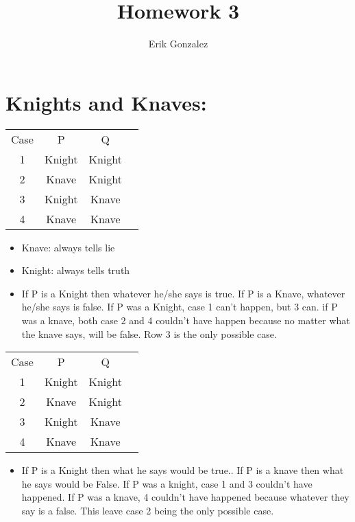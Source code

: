 \documentclass[11pt]{article}
\title{Homework 3}
\author{Erik Gonzalez}
\begin{document}
\maketitle



\section*{Knights and Knaves:}



\begin{center}
\begin{tabular}{ |c|c|c|c| } 
 \hline
Case & P & Q \\ 
1 & Knight & Knight \\ 
2 & Knave & Knight \\ 
3 & Knight & Knave \\
4 & Knave & Knave \\
 \hline
\end{tabular}
\end{center}


\begin{itemize}
\item Knave: always tells lie
\item Knight: always tells truth 
\item If P is a Knight then whatever he/she says is true. If P is a Knave, whatever he/she says is false. If P was a Knight, case 1 can't happen, but 3 can. if P was a knave, both case 2 and 4 couldn't have happen because no matter what the knave says, will be false. Row 3 is the only possible case.
\end{itemize}


 
 
 
\begin{center}
\begin{tabular}{ |c|c|c|c| } 
 \hline
Case & P & Q \\ 
1 & Knight & Knight \\ 
2 & Knave & Knight \\ 
3 & Knight & Knave \\
4 & Knave & Knave \\
 \hline
\end{tabular}
\end{center}

 \begin{itemize}
\item  If P is a Knight then what he says would be true.. If P is a knave then what he says would be False. If P was a knight, case 1 and 3 couldn't have happened. If P was a knave, 4 couldn't have happened because whatever they say is a false. This leave case 2 being the only possible case.
\end{itemize}
\end{document}
